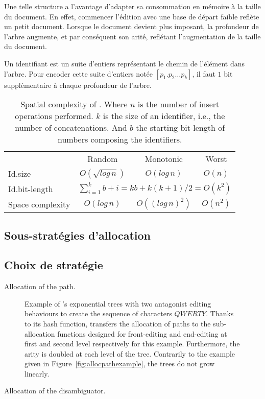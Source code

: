 Une telle structure a l'avantage d'adapter sa consommation en mémoire à la
taille du document. En effet, commencer l'édition avec une base de départ faible
reflète un petit document. Lorsque le document devient plus imposant, la
profondeur de l'arbre augmente, et par conséquent son arité, reflétant
l'augmentation de la taille du document.

Un identifiant \LSEQ est un suite d'entiers représentant le chemin de l'élément
dans l'arbre. Pour encoder cette suite d'entiers notée $[p_1.p_2\ldots p_k]$, il
faut $1$ bit supplémentaire à chaque profondeur de l'arbre. 

\begin{table}
  \centering
  \begin{tabular}{@{}lccc@{}}
    \toprule
    & Random & Monotonic & Worst \\ \cmidrule{2-4}
    Id.size & $O(\sqrt{log\,n})$ & $O(log\,n)$ & $O(n)$ \\ \midrule
    Id.bit-length & \multicolumn{3}{c}{ $\sum\limits_{i=1}^{k}b+i =
      kb + k(k+1)/2 = O(k^2)$} \\ \midrule
    Space complexity & $O(log\,n)$ & $O((log\,n)^2)$ &
    $O(n^2)$ \\ \bottomrule
  \end{tabular}
  \caption{Spatial complexity of \LSEQ. Where $n$ is the number
    of insert operations performed. $k$ is the size of an identifier, i.e.,
    the number of concatenations. And $b$ the starting bit-length of numbers
    composing the identifiers.}
\end{table}

\subsection{Sous-stratégies d'allocation}


\subsection{Choix de stratégie}


\begin{algorithm}
  
  \caption{\label{algo:allocpath}Allocation of the path.}
\end{algorithm}

\begin{figure}
  \centering
  
  \caption{\label{fig:lseqtreeexample} Example of \LSEQ's exponential trees
    with two antagonist editing behaviours to create the sequence of characters
    $QWERTY$. Thanks to its hash function, \LSEQ transfers the allocation of
    paths to the sub-allocation functions designed for front-editing and
    end-editing at first and second level respectively for this
    example. Furthermore, the arity is doubled at each level of the
    tree. Contrarily to the example given in Figure~\ref{fig:allocpathexample},
    the trees do not grow linearly.}
\end{figure}

\begin{algorithm}
  
  \caption{\label{algo:allocdes}Allocation of the disambiguator.}
\end{algorithm}



